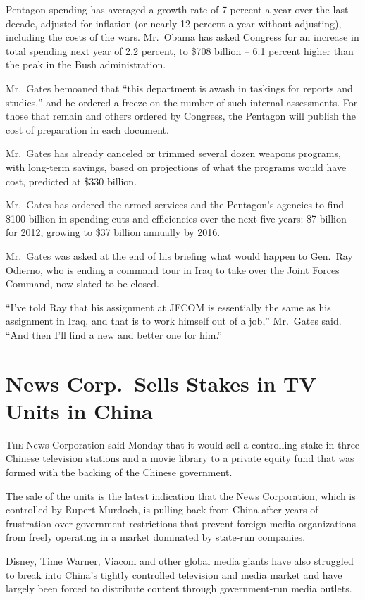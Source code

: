 ﻿\documentclass[12pt]{article}
\begin{document}
Pentagon spending has averaged a growth rate of 7 percent a year over the last decade, adjusted for
inflation (or nearly 12 percent a year without adjusting), including the costs of the wars.
Mr.~Obama has asked Congress for an increase in total spending next year of 2.2 percent, to \$708
billion -- 6.1 percent higher than the peak in the Bush administration.

Mr.~Gates bemoaned that ``this department is awash in taskings for reports and studies,'' and he
ordered a freeze on the number of such internal assessments. For those that remain and others
ordered by Congress, the Pentagon will publish the cost of preparation in each document.

Mr.~Gates has already canceled or trimmed several dozen weapons programs, with long-term savings,
based on projections of what the programs would have cost, predicted at \$330 billion.

Mr.~Gates has ordered the armed services and the Pentagon's agencies to find \$100 billion in
spending cuts and efficiencies over the next five years: \$7 billion for 2012, growing to \$37
billion annually by 2016.

Mr.~Gates was asked at the end of his briefing what would happen to Gen.~Ray Odierno, who is ending
a command tour in Iraq to take over the Joint Forces Command, now slated to be closed.

``I've told Ray that his assignment at JFCOM is essentially the same as his assignment in Iraq, and
that is to work himself out of a job,'' Mr.~Gates said. ``And then I'll find a new and better one
for him.''

\section{News Corp.~Sells Stakes in TV Units in China}

\lettrine{T}{he} News Corporation said Monday that it would sell a
controlling stake in three Chinese television stations and a movie library to a private equity fund
that was formed with the backing of the Chinese government.

The sale of the units is the latest indication that the News Corporation, which is controlled by
Rupert Murdoch, is pulling back from China after years of frustration over government restrictions
that prevent foreign media organizations from freely operating in a market dominated by state-run
companies.

Disney, Time Warner, Viacom and other global media giants have also struggled to break into China's
tightly controlled television and media market and have largely been forced to distribute content
through government-run media outlets.
\end{document}
